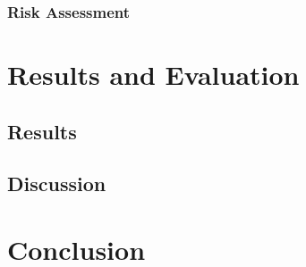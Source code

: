 \documentclass[11pt,a4paper]{article}
\begin{document}
\subsubsection{Risk Assessment}

\section{Results and Evaluation}
\subsection{Results}
\subsection{Discussion}


\section{Conclusion}

	
	
	
\end{document}
